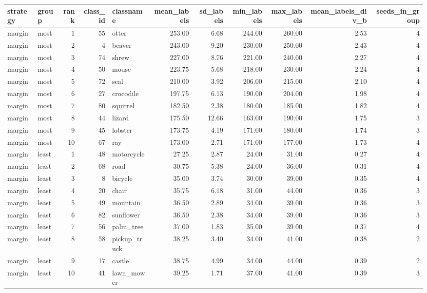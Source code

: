\begin{tabular}{llrrlrrrrrr}
\toprule
strategy & group & rank & class_id & classname & mean_labels & sd_labels & min_labels & max_labels & mean_labels_div_b & seeds_in_group \\
\midrule
margin & most & 1 & 55 & otter & 253.00 & 6.68 & 244.00 & 260.00 & 2.53 & 4 \\
margin & most & 2 & 4 & beaver & 243.00 & 9.20 & 230.00 & 250.00 & 2.43 & 4 \\
margin & most & 3 & 74 & shrew & 227.00 & 8.76 & 221.00 & 240.00 & 2.27 & 4 \\
margin & most & 4 & 50 & mouse & 223.75 & 5.68 & 218.00 & 230.00 & 2.24 & 4 \\
margin & most & 5 & 72 & seal & 210.00 & 3.92 & 206.00 & 215.00 & 2.10 & 4 \\
margin & most & 6 & 27 & crocodile & 197.75 & 6.13 & 190.00 & 204.00 & 1.98 & 4 \\
margin & most & 7 & 80 & squirrel & 182.50 & 2.38 & 180.00 & 185.00 & 1.82 & 4 \\
margin & most & 8 & 44 & lizard & 175.50 & 12.66 & 163.00 & 190.00 & 1.75 & 3 \\
margin & most & 9 & 45 & lobster & 173.75 & 4.19 & 171.00 & 180.00 & 1.74 & 3 \\
margin & most & 10 & 67 & ray & 173.00 & 2.71 & 171.00 & 177.00 & 1.73 & 4 \\
margin & least & 1 & 48 & motorcycle & 27.25 & 2.87 & 24.00 & 31.00 & 0.27 & 4 \\
margin & least & 2 & 68 & road & 30.75 & 5.38 & 24.00 & 36.00 & 0.31 & 4 \\
margin & least & 3 & 8 & bicycle & 35.00 & 3.74 & 30.00 & 39.00 & 0.35 & 4 \\
margin & least & 4 & 20 & chair & 35.75 & 6.18 & 31.00 & 44.00 & 0.36 & 3 \\
margin & least & 5 & 49 & mountain & 36.50 & 2.89 & 34.00 & 39.00 & 0.36 & 3 \\
margin & least & 6 & 82 & sunflower & 36.50 & 2.38 & 34.00 & 39.00 & 0.36 & 3 \\
margin & least & 7 & 56 & palm_tree & 37.00 & 1.83 & 35.00 & 39.00 & 0.37 & 4 \\
margin & least & 8 & 58 & pickup_truck & 38.25 & 3.40 & 34.00 & 41.00 & 0.38 & 2 \\
margin & least & 9 & 17 & castle & 38.75 & 4.99 & 34.00 & 44.00 & 0.39 & 2 \\
margin & least & 10 & 41 & lawn_mower & 39.25 & 1.71 & 37.00 & 41.00 & 0.39 & 3 \\

\end{tabular}

